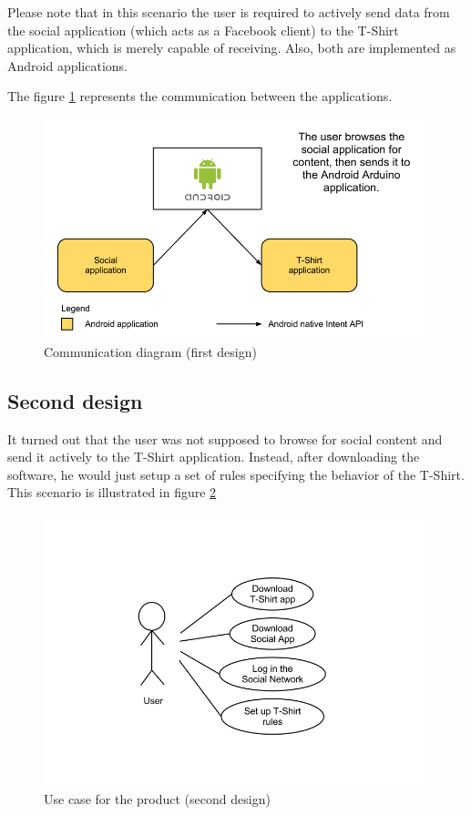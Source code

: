 Please note that in this scenario the user is required to actively send data from
the social application (which acts as a Facebook client) to the T-Shirt application,
which is merely capable of receiving. Also, both are implemented as Android applications.



The figure \ref{fig:design-resp} represents the communication between the applications.

\begin{figure}[h!]
	\centering \includegraphics[scale=0.35]{img/design-resp.png}
	\caption{Communication diagram (first design)}
	\label{fig:design-resp}
\end{figure}


\subsection{Second design}
It turned out that the user was not supposed to browse for social content and send it actively
to the T-Shirt application. Instead, after downloading the software, he would just setup a set of rules
specifying the behavior of the T-Shirt. This scenario is illustrated in figure \ref{fig:design-usecase2}

\begin{figure}[h!]
	\centering \includegraphics[scale=0.35]{img/design-usecase2}
	\caption{Use case for the product (second design)}
	\label{fig:design-usecase2}
\end{figure}

